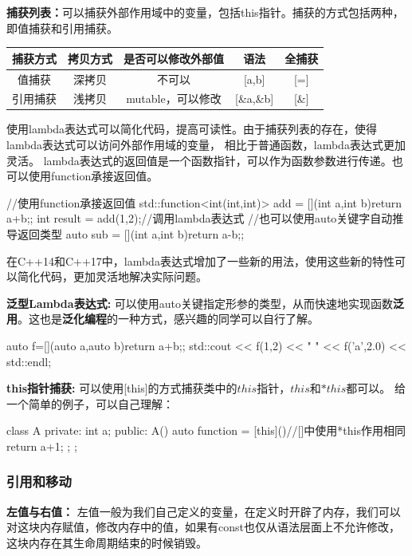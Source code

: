 \textbf{捕获列表：}可以捕获外部作用域中的变量，包括this指针。捕获的方式包括两种，即值捕获和引用捕获。


\begin{center}

    \begin{tabular}{ccccc}
        \hline
        捕获方式 & 拷贝方式 & 是否可以修改外部值 & 语法 & 全捕获\\
        \hline
        值捕获 & 深拷贝 & 不可以 & [a,b] & [=]\\
        引用捕获 & 浅拷贝 & mutable，可以修改 & [\&a,\&b] & [\&]\\
        \hline
        
    \end{tabular}
\end{center}

使用lambda表达式可以简化代码，提高可读性。由于捕获列表的存在，使得lambda表达式可以访问外部作用域的变量，
相比于普通函数，lambda表达式更加灵活。
lambda表达式的返回值是一个函数指针，可以作为函数参数进行传递。也可以使用function承接返回值。
\begin{tcode}
//使用function承接返回值
std::function<int(int,int)> add = [](int a,int b){return a+b;};
int result = add(1,2);//调用lambda表达式
//也可以使用auto关键字自动推导返回类型
auto sub = [](int a,int b){return a-b;};
\end{tcode}

在C++14和C++17中，lambda表达式增加了一些新的用法，使用这些新的特性可以简化代码，更加灵活地解决实际问题。

\textbf{泛型Lambda表达式:} 
可以使用auto关键指定形参的类型，从而快速地实现函数\textbf{泛用}。这也是\textbf{泛化编程}的一种方式，感兴趣的同学可以自行了解。
\begin{tcode}
auto f=[](auto a,auto b){return a+b;};
std::cout << f(1,2) << " " << f('a',2.0) << std::endl;
\end{tcode}

\textbf{this指针捕获:} 
可以使用[this]的方式捕获类中的$this$指针，$this$和$*this$都可以。
给一个简单的例子，可以自己理解：
\begin{tcode}
class A{
private:
    int a;
public:
    A(){
        auto function = [this](){//[]中使用*this作用相同
            return a+1;
        };
    }
};
\end{tcode}
\subsubsection{引用和移动}
\textbf{左值与右值：}
左值一般为我们自己定义的变量，在定义时开辟了内存，我们可以对这块内存赋值，修改内存中的值，如果有const也仅从语法层面上不允许修改，这块内存在其生命周期结束的时候销毁。

